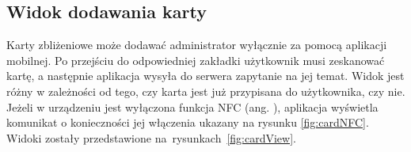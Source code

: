 \subsection{Widok dodawania karty}

Karty zbliżeniowe może dodawać administrator wyłącznie za pomocą aplikacji mobilnej. Po przejściu do odpowiedniej zakładki użytkownik musi zeskanować kartę, a następnie aplikacja wysyła do serwera zapytanie na jej temat. Widok jest różny w zależności od tego, czy karta jest już przypisana do użytkownika, czy nie. Jeżeli w urządzeniu jest wyłączona funkcja NFC (ang. ), aplikacja wyświetla komunikat o konieczności jej włączenia ukazany na rysunku \ref{fig:cardNFC}. Widoki zostały przedstawione na~rysunkach~\ref{fig:cardView}.

\begin{figure}[H]
    \centering
    \begin{subfigure}[b]{0.3\textwidth}
        \centering

\end{subfigure}
\end{figure}
